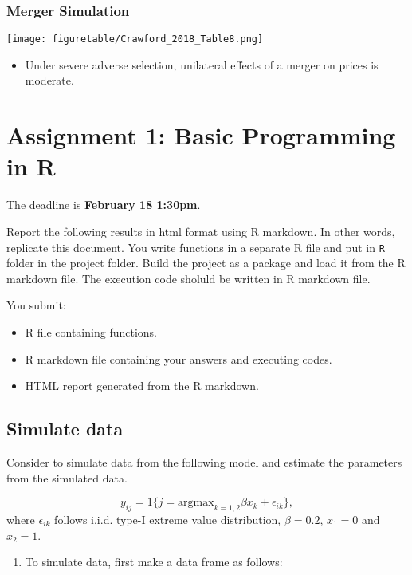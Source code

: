 \documentclass[
]{book}
\providecommand{\tightlist}{%
  \setlength{\itemsep}{0pt}\setlength{\parskip}{0pt}}
\begin{document}
\hypertarget{merger-simulation}{%
\subsection{Merger Simulation}\label{merger-simulation}}

\texttt{[image: figuretable/Crawford\_2018\_Table8.png]}

\begin{itemize}
\tightlist
\item
  Under severe adverse selection, unilateral effects of a merger on prices is moderate.
\end{itemize}

\hypertarget{assignment1}{%
\chapter{Assignment 1: Basic Programming in R}\label{assignment1}}

The deadline is \textbf{February 18 1:30pm}.

Report the following results in html format using R markdown. In other words, replicate this document. You write functions in a separate R file and put in \texttt{R} folder in the project folder. Build the project as a package and load it from the R markdown file. The execution code sholuld be written in R markdown file.

You submit:

\begin{itemize}
\tightlist
\item
  R file containing functions.
\item
  R markdown file containing your answers and executing codes.
\item
  HTML report generated from the R markdown.
\end{itemize}

\hypertarget{simulate-data}{%
\section{Simulate data}\label{simulate-data}}

Consider to simulate data from the following model and estimate the parameters from the simulated data.

\[
y_{ij} = 1\{j = \text{argmax}_{k = 1, 2} \beta x_k + \epsilon_{ik} \},
\]
where \(\epsilon_{ik}\) follows i.i.d. type-I extreme value distribution, \(\beta = 0.2\), \(x_1 = 0\) and \(x_2 = 1\).

\begin{enumerate}
\def\labelenumi{\arabic{enumi}.}
\tightlist
\item
  To simulate data, first make a data frame as follows:
\end{enumerate}
\end{document}
